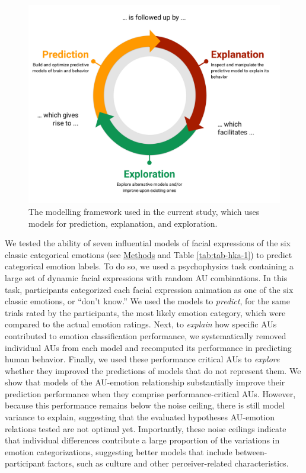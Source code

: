 \documentclass[12pt,american,a4paper,oneside,]{memoir} %
\begin{document}
\begin{figure}
\centering
\includegraphics{_bookdown_files/hypothesis-kernel-analysis-files/figures/figure_1.pdf}
\caption{\label{fig:fig-hka-1}The modelling framework used in the current study, which uses models for prediction, explanation, and exploration.}
\end{figure}



We tested the ability of seven influential models of facial expressions of the six classic categorical emotions (see \protect\hyperlink{hka-methods}{Methods} and Table \ref{tab:tab-hka-1}) to predict categorical emotion labels. To do so, we used a psychophysics task containing a large set of dynamic facial expressions with random AU combinations. In this task, participants categorized each facial expression animation as one of the six classic emotions, or ``don't know.'' We used the models to \emph{predict}, for the same trials rated by the participants, the most likely emotion category, which were compared to the actual emotion ratings. Next, to \emph{explain} how specific AUs contributed to emotion classification performance, we systematically removed individual AUs from each model and recomputed its performance in predicting human behavior. Finally, we used these performance critical AUs to \emph{explore} whether they improved the predictions of models that do not represent them. We show that models of the AU-emotion relationship substantially improve their prediction performance when they comprise performance-critical AUs. However, because this performance remains below the noise ceiling, there is still model variance to explain, suggesting that the evaluated hypotheses AU-emotion relations tested are not optimal yet. Importantly, these noise ceilings indicate that individual differences contribute a large proportion of the variations in emotion categorizations, suggesting better models that include between-participant factors, such as culture and other perceiver-related characteristics.
\end{document}

